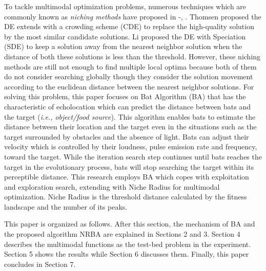 \documentclass[conference]{IEEEtran}
\begin{document}
To tackle multimodal optimization problems, numerous techniques which are commonly known as \textit{niching methods} have proposed in \cite{Niching}-\cite{EAs02}, \cite{CDE} \cite{SDE}. Thomsen proposed the DE \cite{DE} extends with a crowding scheme (CDE) \cite{CDE} to replace the high-quality solution by the most similar candidate solutions. Li proposed the DE with Speciation (SDE) \cite{SDE} to keep a solution away from the nearest neighbor solution when the distance of both these solutions is less than the threshold. However, these niching methods are still not enough to find multiple local optima because both of them do not consider searching globally though they consider the solution movement according to the euclidean distance between the nearest neighbor solutions. For solving this problem, this paper focuses on Bat Algorithm (BA) that has the characteristic of echolocation which can predict the distance between bats and the target (\textit{i.e., object/food source}). This algorithm enables bats to estimate the distance between their location and the target even in the situations such as the target surrounded by obstacles and the absence of light. Bats can adjust their velocity which is controlled by their loudness, pulse emission rate and frequency, toward the target. While the iteration search step continues until bats reaches the target in the evolutionary process, bats will stop searching the target within its perceptible distance. This research employs BA which copes with exploitation and exploration search, extending with Niche Radius for multimodal optimization. Niche Radius is the threshold distance calculated by the fitness landscape and the number of its peaks.

This paper is organized as follows. After this section, the mechanism of BA and the proposed algorithm NRBA are explained in Sections 2 and 3. Section 4 describes the multimodal functions as the test-bed problem in the experiment. Section 5 shows the results while Section 6 discusses them. Finally, this paper concludes in Section 7.
\end{document}
